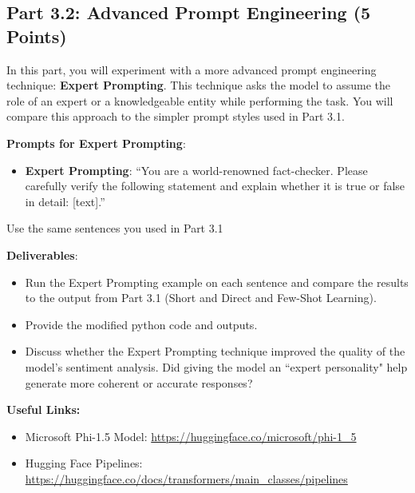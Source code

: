 \documentclass[11pt, oneside]{article}   	%
\begin{document}
\subsection*{Part 3.2: Advanced Prompt Engineering (5 Points)}

In this part, you will experiment with a more advanced prompt engineering technique: \textbf{Expert Prompting}. This technique asks the model to assume the role of an expert or a knowledgeable entity while performing the task. You will compare this approach to the simpler prompt styles used in Part 3.1.

\textbf{Prompts for Expert Prompting}:
\begin{itemize}
    \item \textbf{Expert Prompting}: “You are a world-renowned fact-checker. Please carefully verify the following statement and explain whether it is true or false in detail: [text].”
\end{itemize}

Use the same sentences you used in Part 3.1

\textbf{Deliverables}:
\begin{itemize}
    \item Run the Expert Prompting example on each sentence and compare the results to the output from Part 3.1 (Short and Direct and Few-Shot Learning).
    \item Provide the modified python code and outputs.
    \item Discuss whether the Expert Prompting technique improved the quality of the model’s sentiment analysis. Did giving the model an ``expert personality" help generate more coherent or accurate responses?
\end{itemize}

\textbf{Useful Links:}
\begin{itemize}
    \item Microsoft Phi-1.5 Model: \href{https://huggingface.co/microsoft/phi-1_5}{https://huggingface.co/microsoft/phi-1\_5}
    \item Hugging Face Pipelines: \href{https://huggingface.co/docs/transformers/main_classes/pipelines}{https://huggingface.co/docs/transformers/main\_classes/pipelines}
\end{itemize}
\end{document}
